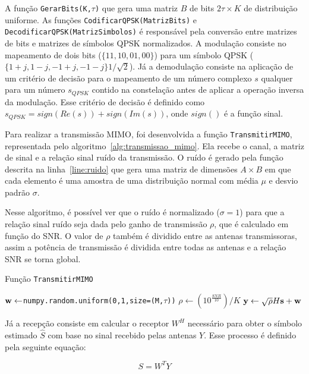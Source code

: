 \documentclass{article}
\begin{document}
A função \texttt{GerarBits(K,$\tau$)} que gera uma matriz $B$ de bits $2\tau\times K$ de distribuição uniforme. As funções \texttt{CodificarQPSK(MatrizBits)} e \texttt{DecodificarQPSK(MatrizSimbolos)} é responsável pela conversão entre matrizes de bits e matrizes de símbolos QPSK normalizados. A modulação consiste no mapeamento de dois bits ($\{11,10,01,00\}$) para um símbolo QPSK ($\{1+j,1-j,-1+j,-1-j\}1/\sqrt{2}$). Já a demodulação consiste na aplicação de um critério de decisão para o mapeamento de um número complexo $s$ qualquer para um número $s_{QPSK}$ contido na constelação antes de aplicar a operação inversa da modulação. Esse critério de decisão é definido como $s_{QPSK}=sign(Re(s))+sign(Im(s))$, onde $sign()$ é a função sinal.

Para realizar a transmissão MIMO, foi desenvolvida a função \texttt{TransmitirMIMO}, representada pelo algoritmo~\ref{alg:transmissao_mimo}. Ela recebe o canal, a matriz de sinal e a relação sinal ruído da transmissão. O ruído é gerado pela função descrita na linha~\ref{line:ruido} que gera uma matriz de dimensões $A\times B$ em que cada elemento é uma amostra de uma distribuição normal com média $\mu$ e desvio padrão $\sigma$. 

Nesse algoritmo, é possível ver que o ruído é normalizado ($\sigma=1$) para que a relação sinal ruído seja dada pelo ganho de transmissão $\rho$, que é calculado em função do SNR. O valor de $\rho$ também é dividido entre as antenas transmissoras, assim a potência de transmissão é dividida entre todas as antenas e a relação SNR se torna global. 

\begin{algorithm}
    \label{alg:transmissao_mimo}
    \caption{Função \texttt{TransmitirMIMO}}
    \KwResult{$\ybf$}
    $\mathbf{w} \gets $\texttt{numpy.random.uniform(0,1,size=(M,$\tau$))}\; \label{line:ruido}
    $\rho \gets (10^{\frac{SNR}{10}})/K$\;
    $\mathbf{y} \gets \sqrt{\rho}H\mathbf{s}+\mathbf{w}$\;
\end{algorithm}

Já a recepção consiste em calcular o receptor $W^H$ necessário para obter o símbolo estimado $\hat{S}$ com base no sinal recebido pelas antenas $Y$. Esse processo é definido pela seguinte equação:

\begin{equation}
    S = W^TY
\end{equation}
\end{document}
